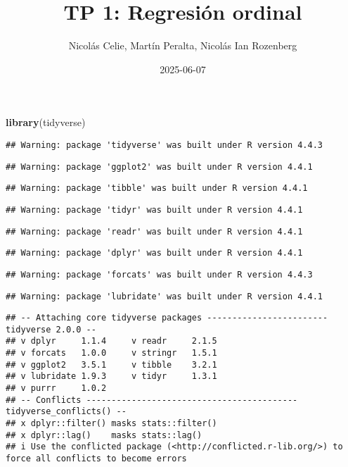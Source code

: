 \documentclass[
]{article}
\title{TP 1: Regresión ordinal}
\author{Nicolás Celie, Martín Peralta, Nicolás Ian Rozenberg}
\date{2025-06-07}
\newenvironment{Shaded}{\begin{snugshade}}{\end{snugshade}}
\newcommand{\FunctionTok}[1]{\textcolor[rgb]{0.13,0.29,0.53}{\textbf{#1}}}
\newcommand{\NormalTok}[1]{#1}
\begin{document}
\maketitle

\begin{Shaded}
\begin{Highlighting}[]
\FunctionTok{library}\NormalTok{(tidyverse)}
\end{Highlighting}
\end{Shaded}

\begin{verbatim}
## Warning: package 'tidyverse' was built under R version 4.4.3
\end{verbatim}

\begin{verbatim}
## Warning: package 'ggplot2' was built under R version 4.4.1
\end{verbatim}

\begin{verbatim}
## Warning: package 'tibble' was built under R version 4.4.1
\end{verbatim}

\begin{verbatim}
## Warning: package 'tidyr' was built under R version 4.4.1
\end{verbatim}

\begin{verbatim}
## Warning: package 'readr' was built under R version 4.4.1
\end{verbatim}

\begin{verbatim}
## Warning: package 'dplyr' was built under R version 4.4.1
\end{verbatim}

\begin{verbatim}
## Warning: package 'forcats' was built under R version 4.4.3
\end{verbatim}

\begin{verbatim}
## Warning: package 'lubridate' was built under R version 4.4.1
\end{verbatim}

\begin{verbatim}
## -- Attaching core tidyverse packages ------------------------ tidyverse 2.0.0 --
## v dplyr     1.1.4     v readr     2.1.5
## v forcats   1.0.0     v stringr   1.5.1
## v ggplot2   3.5.1     v tibble    3.2.1
## v lubridate 1.9.3     v tidyr     1.3.1
## v purrr     1.0.2     
## -- Conflicts ------------------------------------------ tidyverse_conflicts() --
## x dplyr::filter() masks stats::filter()
## x dplyr::lag()    masks stats::lag()
## i Use the conflicted package (<http://conflicted.r-lib.org/>) to force all conflicts to become errors
\end{verbatim}
\end{document}
